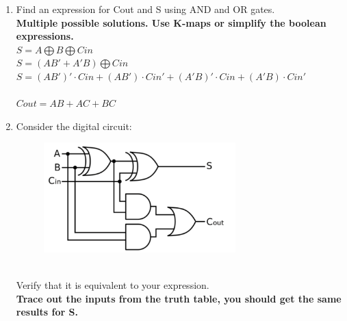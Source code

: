 \documentclass{article}
\begin{document}
\begin{enumerate}[label=\alph*.]
    \item Find an expression for Cout and S using AND and OR gates.\\
    \textbf{Multiple possible solutions. Use K-maps or simplify the boolean expressions.}\\
    $S = A \bigoplus B \bigoplus Cin$ \\
    $S = (AB' + A'B) \bigoplus Cin$ \\
    $S = (AB')' \cdot Cin + (AB') \cdot Cin' + (A'B)' \cdot Cin + (A'B) \cdot Cin'$ \\
    \\
    $Cout = AB + AC + BC$
    
    \item Consider the digital circuit: 
    \begin{figure}[!h]
        \centering
        \includegraphics[width=0.7\textwidth]{figures/adder1b.png}
    \end{figure}
    \\ Verify that it is equivalent to your expression. \\
    \textbf{Trace out the inputs from the truth table, you should get the same results for S.}
\end{enumerate}
\end{document}
